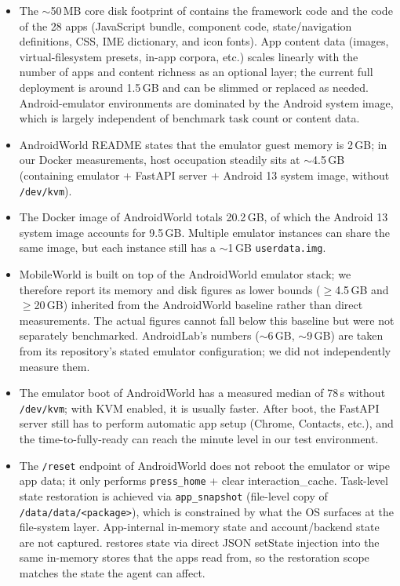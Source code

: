 \begin{itemize}
  \item The $\sim$50\,MB core disk footprint of \sys{} contains the framework code and the code of the 28 apps (JavaScript bundle, component code, state/navigation definitions, CSS, IME dictionary, and icon fonts). App content data (images, virtual-filesystem presets, in-app corpora, etc.) scales linearly with the number of apps and content richness as an optional layer; the current full deployment is around 1.5\,GB and can be slimmed or replaced as needed. Android-emulator environments are dominated by the Android system image, which is largely independent of benchmark task count or content data.

  \item AndroidWorld README states that the emulator guest memory is 2\,GB; in our Docker measurements, host occupation steadily sits at $\sim$4.5\,GB (containing emulator + FastAPI server + Android 13 system image, without \texttt{/dev/kvm}).

  \item The Docker image of AndroidWorld totals 20.2\,GB, of which the Android 13 system image accounts for 9.5\,GB. Multiple emulator instances can share the same image, but each instance still has a $\sim$1\,GB \texttt{userdata.img}.

  \item MobileWorld is built on top of the AndroidWorld emulator stack; we therefore report its memory and disk figures as lower bounds ($\geq$4.5\,GB and $\geq$20\,GB) inherited from the AndroidWorld baseline rather than direct measurements. The actual figures cannot fall below this baseline but were not separately benchmarked. AndroidLab's numbers ($\sim$6\,GB, $\sim$9\,GB) are taken from its repository's stated emulator configuration; we did not independently measure them.

  \item The emulator boot of AndroidWorld has a measured median of 78\,s without \texttt{/dev/kvm}; with KVM enabled, it is usually faster. After boot, the FastAPI server still has to perform automatic app setup (Chrome, Contacts, etc.), and the time-to-fully-ready can reach the minute level in our test environment.

  \item The \texttt{/reset} endpoint of AndroidWorld does not reboot the emulator or wipe app data; it only performs \texttt{press\_home} + clear interaction\_cache. Task-level state restoration is achieved via \texttt{app\_snapshot} (file-level copy of \texttt{/data/data/<package>}), which is constrained by what the OS surfaces at the file-system layer. App-internal in-memory state and account/backend state are not captured. \sys{} restores state via direct JSON setState injection into the same in-memory stores that the apps read from, so the restoration scope matches the state the agent can affect.


\end{itemize}
